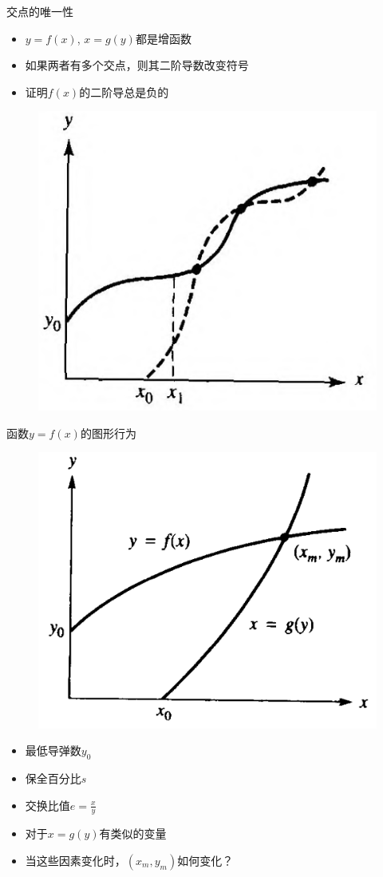 \documentclass[UTF8]{ctexbeamer}
\begin{document}
\begin{frame}{交点的唯一性}
  \begin{itemize}
  \item $y=f(x)$, $x=g(y)$都是增函数
  \item 如果两者有多个交点，则其二阶导数改变符号
  \item 证明$f(x)$的二阶导总是负的
  \end{itemize}

  \begin{figure}
    \centering
    \includegraphics[width=.5\textwidth]{neg.png}
  \end{figure}
  
\end{frame}

\begin{frame}{函数$y=f(x)$的图形行为}

  \begin{figure}
    \centering
    \includegraphics[width=.4\textwidth]{model.png}
  \end{figure}
  
  \begin{itemize}
  \item 最低导弹数$y_0$
  \item 保全百分比$s$
  \item 交换比值$e = \frac{x}{y}$
  \item 对于$x=g(y)$有类似的变量
  \item 当这些因素变化时，$(x_m, y_m)$如何变化？
  \end{itemize}
  
\end{frame}
\end{document}

